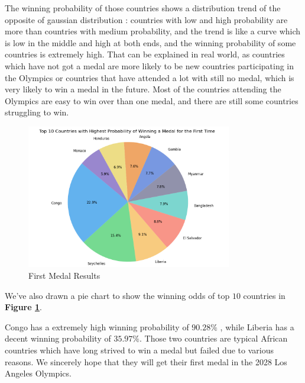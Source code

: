The winning probability of those countries shows a distribution trend of the opposite of gaussian distribution : countries with low and high probability are more than countries with medium probability, and the trend is like a curve which is low in the middle and high at both ends, and the winning probability of some countries is extremely high. That can be explained in real world, as countries which have not got a medal are more likely to be new countries participating in the Olympics or countries that have attended a lot with still no medal, which is very likely to win a medal in the future. Most of the countries attending the Olympics are easy to win over than one medal, and there are still some countries struggling to win.
\begin{figure}[h]
    \centering
    \includegraphics[width=0.8\textwidth]{../figures/first_medal_pie.png}
    \caption{First Medal Results}
    \label{fig:first_medal_pie}
\end{figure}

We've also drawn a pie chart to show the winning odds of top $10$ countries in \textbf{Figure \ref{fig:first_medal_pie}}. 

Congo has a extremely high winning probability of $90.28\%$ , while Liberia has a decent winning probability of $35.97\%$. Those two countries are typical African countries which have long strived to win a medal but failed due to various reasons. We sincerely hope that they will get their first medal in the 2028 Los Angeles Olympics.